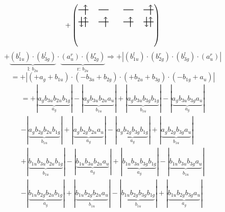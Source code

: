 \documentclass{article}
\begin{document}
\[+\left(\begin{tikzpicture}
    \draw[thick] (0,0) -- (0.5,0); %
    \draw[thick] (1,0) -- (1.5,0); %
    \draw[thick] (0,-0.6) -- (0.5,-0.6); %
    \draw[thick] (1,-0.6) -- (1.5,-0.6); %
\draw[->, thick] (0.35, -0.25) -- (0.35, 0.25); 
\draw[-> , thick] (0.35, -0.85) -- (0.35, -0.35); 
\draw[<- , thick] (0.15, -0.85) -- (0.15, -0.35); 
 \draw[-> , thick] (1.35, -0.85) -- (1.35, -0.35); 
\end{tikzpicture}\qquad \begin{tikzpicture}
    \draw[thick] (0,0) -- (0.5,0); %
    \draw[thick] (1,0) -- (1.5,0); %
    \draw[thick] (0,-0.6) -- (0.5,-0.6); %
    \draw[thick] (1,-0.6) -- (1.5,-0.6); %
\draw[->, thick] (1.35, -0.25) -- (1.35, 0.25); 
\draw[-> , thick] (0.35, -0.85) -- (0.35, -0.35); 
 \draw[-> , thick] (1.35, -0.85) -- (1.35, -0.35); 
\draw[<- , thick] (1.15, -0.85) -- (1.15, -0.35); 
\end{tikzpicture}\right)\]$$+ \underbrace{(b_{1u}^{l})\cdot (b_{3g}^{l})}_{\text{l: }b_{2u}}\cdot \underbrace{(a_{u}^{r})\cdot (b_{2g}^{r})}_{\text{r: }b_{2u}}\Rightarrow +\left|(b_{1u}^{l}) \cdot (b_{2g}^{r}) \cdot (b_{3g}^{l}) \cdot (a_{u}^{r})\right|$$$$=+\left|(+a_{g}+b_{1u}) \cdot (-b_{3u}+b_{2g}) \cdot (+b_{2u}+b_{3g}) \cdot (-b_{1g}+a_{u})\right|$$\begin{multline*}
=+\left|\underbrace{a_{g} b_{3u} b_{2u} b_{1g}}_{a_{g}}\right|-\left|\underbrace{a_{g} b_{3u} b_{2u} a_{u}}_{b_{1u}}\right|+\left|\underbrace{a_{g} b_{3u} b_{3g} b_{1g}}_{b_{1u}}\right|-\left|\underbrace{a_{g} b_{3u} b_{3g} a_{u}}_{a_{g}}\right|\\
-\left|\underbrace{a_{g} b_{2g} b_{2u} b_{1g}}_{b_{1u}}\right|+\left|\underbrace{a_{g} b_{2g} b_{2u} a_{u}}_{a_{g}}\right|-\left|\underbrace{a_{g} b_{2g} b_{3g} b_{1g}}_{a_{g}}\right|+\left|\underbrace{a_{g} b_{2g} b_{3g} a_{u}}_{b_{1u}}\right|\\
+\left|\underbrace{b_{1u} b_{3u} b_{2u} b_{1g}}_{b_{1u}}\right|-\left|\underbrace{b_{1u} b_{3u} b_{2u} a_{u}}_{a_{g}}\right|+\left|\underbrace{b_{1u} b_{3u} b_{3g} b_{1g}}_{a_{g}}\right|-\left|\underbrace{b_{1u} b_{3u} b_{3g} a_{u}}_{b_{1u}}\right|\\
-\left|\underbrace{b_{1u} b_{2g} b_{2u} b_{1g}}_{a_{g}}\right|+\left|\underbrace{b_{1u} b_{2g} b_{2u} a_{u}}_{b_{1u}}\right|-\left|\underbrace{b_{1u} b_{2g} b_{3g} b_{1g}}_{b_{1u}}\right|+\left|\underbrace{b_{1u} b_{2g} b_{3g} a_{u}}_{a_{g}}\right|

\end{multline*}
\end{document}

